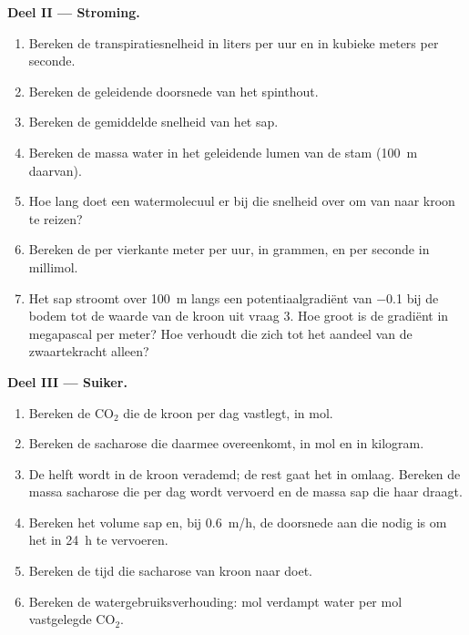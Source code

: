 \begin{problem}
\medskip
\noindent\textbf{Deel II --- Stroming.}
\begin{enumerate}[resume]
  \item Bereken de transpiratiesnelheid in liters per uur en in kubieke
        meters per seconde.
  \item Bereken de geleidende doorsnede van het spinthout.
  \item Bereken de gemiddelde snelheid van het sap.
  \item Bereken de massa water in het geleidende lumen van de stam
        (\qty{100}{m} daarvan).
  \item Hoe lang doet een watermolecuul er bij die snelheid over om van
         naar kroon te reizen?
  \item Bereken de  per vierkante meter  per uur, in
        grammen, en per seconde in millimol.
  \item Het sap stroomt over \qty{100}{m} langs een potentiaalgradiënt
        van \qty{-0.1}{} bij de bodem tot de waarde van de kroon uit vraag
        3. Hoe groot is de gradiënt in megapascal per meter? Hoe
        verhoudt die zich tot het aandeel van de zwaartekracht alleen?
\end{enumerate}

\medskip
\noindent\textbf{Deel III --- Suiker.}
\begin{enumerate}[resume]
  \item Bereken de $\mathrm{CO_2}$ die de kroon per dag vastlegt, in
        mol.
  \item Bereken de sacharose die daarmee overeenkomt, in mol en in
        kilogram.
  \item De helft wordt in de kroon verademd; de rest gaat het  in
        omlaag. Bereken de massa sacharose die per dag wordt vervoerd en
        de massa sap die haar draagt.
  \item Bereken het volume sap en, bij \qty{0.6}{m/h}, de doorsnede aan
         die nodig is om het in \qty{24}{h} te vervoeren.
  \item Bereken de tijd die sacharose van kroon naar  doet.
  \item Bereken de watergebruiksverhouding: mol verdampt water per mol
        vastgelegde $\mathrm{CO_2}$.
\end{enumerate}


\end{problem}

